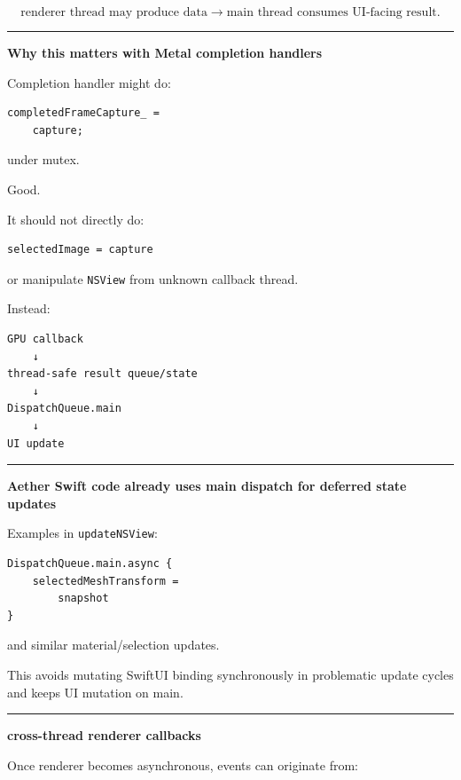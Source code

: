 \[
\boxed{
\text{renderer thread may produce data}
\rightarrow
\text{main thread consumes UI-facing result}.
}
\]

\begin{center}\rule{0.5\linewidth}{0.5pt}\end{center}

\textbf{Why this matters with Metal completion handlers}

Completion handler might do:

\begin{verbatim}
completedFrameCapture_ =
    capture;
\end{verbatim}

under mutex.

Good.

It should not directly do:

\begin{verbatim}
selectedImage = capture
\end{verbatim}

or manipulate \texttt{NSView} from unknown callback thread.

Instead:

\begin{verbatim}
GPU callback
    ↓
thread-safe result queue/state
    ↓
DispatchQueue.main
    ↓
UI update
\end{verbatim}

\begin{center}\rule{0.5\linewidth}{0.5pt}\end{center}

\textbf{Aether Swift code already uses main dispatch for deferred state updates}

Examples in \texttt{updateNSView}:

\begin{verbatim}
DispatchQueue.main.async {
    selectedMeshTransform =
        snapshot
}
\end{verbatim}

and similar material/selection updates.

This avoids mutating SwiftUI binding synchronously in problematic update cycles and keeps UI mutation on main.

\begin{center}\rule{0.5\linewidth}{0.5pt}\end{center}

\textbf{cross-thread renderer callbacks}

Once renderer becomes asynchronous, events can originate from:

